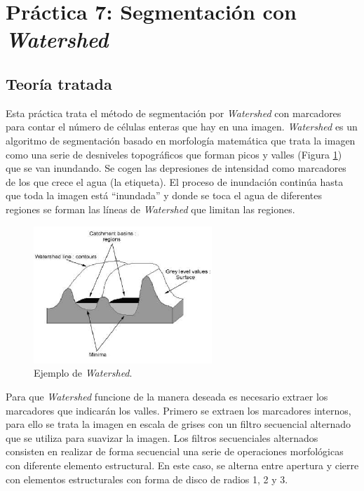 \documentclass[a4paper,12pt]{report}
\begin{document}
\section{ Práctica 7: Segmentación con \emph{Watershed}}
\subsection{Teoría tratada}

Esta práctica trata el método de segmentación por \emph{Watershed} con marcadores para contar el número de células enteras que hay en una imagen.\emph{ Watershed} es un algoritmo de segmentación basado en morfología matemática que trata la imagen como una serie de desniveles topográficos que forman picos y valles (Figura \ref{watershed}) que se van inundando. Se cogen las depresiones de intensidad como marcadores de los que crece el agua (la etiqueta). El proceso de inundación continúa hasta que toda la imagen está ``inundada'' y donde se toca el agua de diferentes regiones se forman las líneas de  \emph{Watershed} que limitan las regiones.\\

\begin{figure}[h]
\centering
\includegraphics[width=0.6\textwidth]{imagenes/valles}
\caption{Ejemplo de \emph{Watershed}.}
\label{watershed} 
\end{figure}

Para que \emph{Watershed} funcione de la manera deseada es necesario extraer los marcadores que indicarán los valles. Primero se extraen los marcadores internos, para ello se trata la imagen en escala de grises con un filtro secuencial alternado que se utiliza para suavizar la imagen. Los filtros secuenciales alternados consisten en realizar de forma secuencial una serie de operaciones morfológicas con diferente elemento estructural. En este caso, se alterna entre apertura y cierre con elementos estructurales con forma de disco de radios 1, 2 y 3.\\
\end{document}
